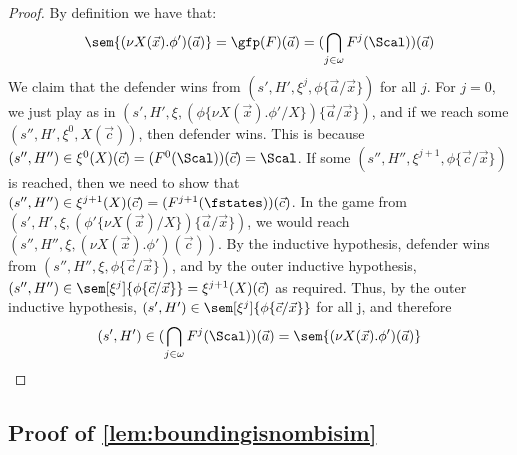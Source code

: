 \begin{proof}
	By definition we have that:
	\[
		\sem{(\nu X(\vec x).\phi')(\vec a)} = \gfp(F)(\vec a) = (\bigcap_{j \in \omega} F^j(\Scal))(\vec a)
	\]
	We claim that the defender wins from $(s', H', \xi^j,\phi\{\vec a / \vec x\})$ for all $j$. 
	For $j = 0$, we just play as in $(s', H', \xi, (\phi\{\nu X(\vec x).\phi' / X\})\{\vec a / \vec x\})$, and if we reach some $(s'', H', \xi^0, X(\vec c))$, then defender wins. 
	This is because $(s'', H'') \in \xi^0(X)(\vec c) = (F^0(\Scal))(\vec c) = \Scal$. 
	If some $(s'', H'', \xi^{j + 1}, \phi\{\vec c / \vec x\})$ is reached, then we need to show that $(s'', H'')\in \xi^{j+1}(X)(\vec c) = (F^{j + 1}(\fstates))(\vec c)$. 
	In the game from $(s', H', \xi, (\phi'\{\nu X(\vec x) / X\})\{\vec a / \vec x\})$, we would reach $(s'', H'', \xi, (\nu X(\vec x).\phi')(\vec c))$. 
	By the inductive hypothesis, defender wins from $(s'', H'',\xi, \phi\{\vec c / \vec x\})$, and by the outer inductive hypothesis, $(s'', H'')\in \sem[\xi^j]{\phi\{\vec c / \vec x\}} = \xi^{j + 1}(X)(\vec c)$ as required.
	Thus, by the outer inductive hypothesis, $(s', H')\in \sem[\xi^j]{\phi\{\vec c / \vec x\}}$ for all j, and therefore 
	\[
	(s', H')\in (\bigcap_{j \in \omega}F^j(\Scal))(\vec a) = \sem{(\nu X(\vec x).\phi')(\vec a)}
	\]
\end{proof}


\subsection{Proof of \cref{lem:boundingisnombisim}}


